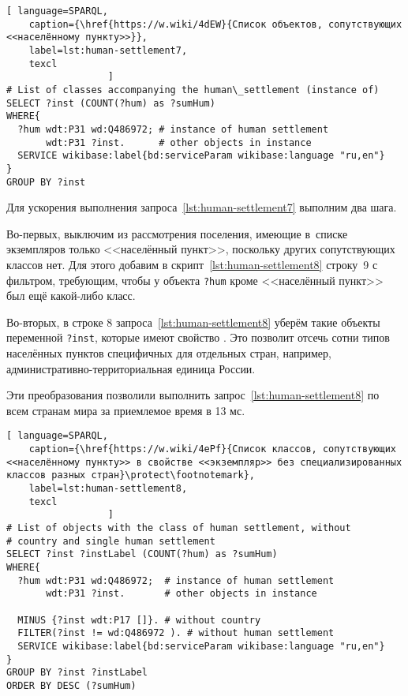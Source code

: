\begin{lstlisting}[ language=SPARQL, 
    caption={\href{https://w.wiki/4dEW}{Cписок объектов, сопутствующих <<населённому пункту>>}},
    label=lst:human-settlement7,
    texcl 
                  ]
# List of classes accompanying the human\_settlement (instance of)
SELECT ?inst (COUNT(?hum) as ?sumHum) 
WHERE{          
  ?hum wdt:P31 wd:Q486972; # instance of human settlement
       wdt:P31 ?inst.      # other objects in instance
  SERVICE wikibase:label{bd:serviceParam wikibase:language "ru,en"}
}  
GROUP BY ?inst
\end{lstlisting}%

Для ускорения выполнения запроса~\ref{lst:human-settlement7} выполним два шага.
 
Во-первых, выключим из рассмотрения поселения, 
имеющие в~списке экземпляров только <<населённый пункт>>, 
поскольку других сопутствующих классов нет. 
Для этого добавим в скрипт~\ref{lst:human-settlement8} строку~\num{9} с фильтром, 
требующим, чтобы у объекта \lstinline|?hum| 
кроме  <<населённый пункт>> был ещё какой-либо класс.

Во-вторых, в строке \num{8} запроса~\ref{lst:human-settlement8} 
уберём такие объекты переменной \lstinline|?inst|, 
которые имеют свойство . 
Это позволит отсечь сотни типов населённых пунктов специфичных для отдельных стран, 
например, административно-территориальная единица России.

Эти преобразования позволили выполнить запрос~\ref{lst:human-settlement8} 
по всем странам мира за приемлемое время в 13 мс.

\lstset{numbers=left, firstnumber=1, frame=single}
\begin{lstlisting}[ language=SPARQL, 
    caption={\href{https://w.wiki/4ePf}{Cписок классов, сопутствующих <<населённому пункту>> в свойстве <<экземпляр>> без специализированных классов разных стран}\protect\footnotemark},
    label=lst:human-settlement8,
    texcl 
                  ]
# List of objects with the class of human settlement, without 
# country and single human settlement
SELECT ?inst ?instLabel (COUNT(?hum) as ?sumHum) 
WHERE{ 
  ?hum wdt:P31 wd:Q486972;  # instance of human settlement
       wdt:P31 ?inst.       # other objects in instance
  
  MINUS {?inst wdt:P17 []}. # without country
  FILTER(?inst != wd:Q486972 ). # without human settlement
  SERVICE wikibase:label{bd:serviceParam wikibase:language "ru,en"}
}  
GROUP BY ?inst ?instLabel
ORDER BY DESC (?sumHum)
\end{lstlisting}%

